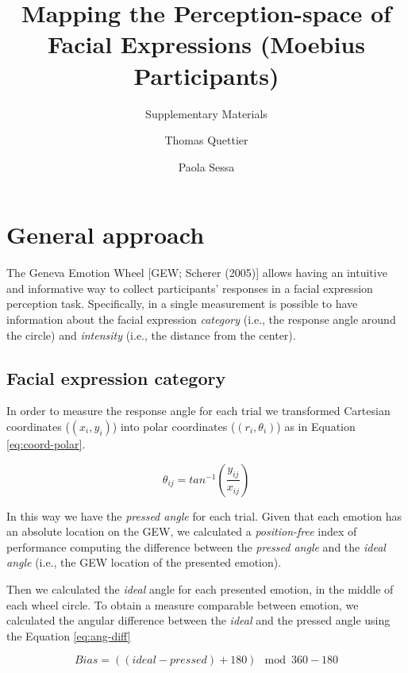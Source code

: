 \documentclass[
]{article}
\title{\textbf{Mapping the Perception-space of Facial Expressions (Moebius Participants)}}
\subtitle{Supplementary Materials}
\author{Thomas Quettier \and Paola Sessa}
\date{}
\begin{document}
\maketitle

{
\setcounter{tocdepth}{3}
\tableofcontents
}
\hypertarget{general-approach}{%
\section{General approach}\label{general-approach}}

The Geneva Emotion Wheel {[}GEW; Scherer (2005){]} allows having an intuitive and informative way to collect participants' responses in a facial expression perception task. Specifically, in a single measurement is possible to have information about the facial expression \emph{category} (i.e., the response angle around the circle) and \emph{intensity} (i.e., the distance from the center).

\hypertarget{facial-expression-category}{%
\subsection{Facial expression category}\label{facial-expression-category}}

In order to measure the response angle for each trial we transformed Cartesian coordinates (\((x_i, y_i)\)) into polar coordinates (\((r_i, \theta_i)\)) as in Equation \eqref{eq:coord-polar}.

\begin{equation}
\theta_{ij} = tan^{-1}(\frac{y_{ij}}{x_{ij}})
\label{eq:coord-polar}
\end{equation}

In this way we have the \emph{pressed angle} for each trial. Given that each emotion has an absolute location on the GEW, we calculated a \emph{position-free} index of performance computing the difference between the \emph{pressed angle} and the \emph{ideal angle} (i.e., the GEW location of the presented emotion).

Then we calculated the \emph{ideal} angle for each presented emotion, in the middle of each wheel circle. To obtain a measure comparable between emotion, we calculated the angular difference between the \emph{ideal} and the pressed angle using the Equation \eqref{eq:ang-diff}

\begin{equation}
Bias = ((ideal - pressed) + 180) \mod 360 - 180
\label{eq:ang-diff}
\end{equation}
\end{document}
